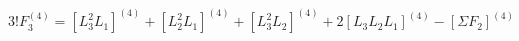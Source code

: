 \begin{equation}
3!F_{3}^{(4)}=[L_3^2L_1]^{(4)}+[L_2^2L_1]^{(4)}+[L_3^2L_2]^{(4)}
+2[L_3L_2L_1]^{(4)}-[\Sigma F_2]^{(4)}
\end{equation}

